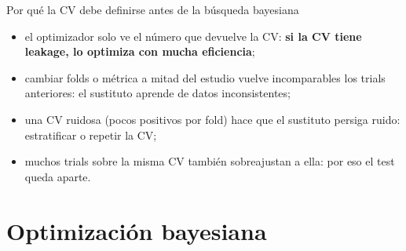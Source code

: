 \documentclass[aspectratio=169,12pt]{beamer}
\begin{document}
\begin{frame}{Por qué la CV debe definirse antes de la búsqueda bayesiana}
  \centering
  \par\vspace{6pt}
  \raggedright\small
  \begin{itemize}
    \item el optimizador solo ve el número que devuelve la CV: \textbf{si la CV tiene leakage, lo optimiza con mucha eficiencia};
    \item cambiar folds o métrica a mitad del estudio vuelve incomparables los trials anteriores: el sustituto aprende de datos inconsistentes;
    \item una CV ruidosa (pocos positivos por fold) hace que el sustituto persiga ruido: estratificar o repetir la CV;
    \item muchos trials sobre la misma CV también sobreajustan a ella: por eso el test queda aparte.
  \end{itemize}
\end{frame}

\section{Optimización bayesiana}
\end{document}
